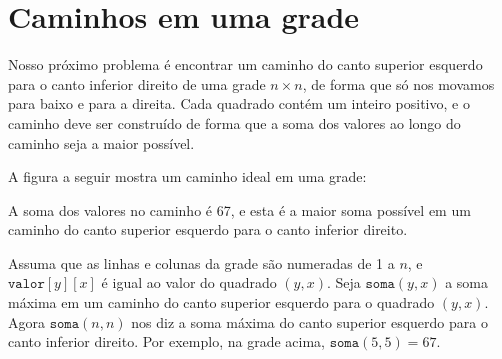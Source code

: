 \section{Caminhos em uma grade}

Nosso próximo problema é encontrar um caminho
do canto superior esquerdo para
o canto inferior direito
de uma grade $n \times n$, de forma que
só nos movamos para baixo e para a direita.
Cada quadrado contém um inteiro positivo,
e o caminho deve ser construído de forma
que a soma dos valores ao longo
do caminho seja a maior possível.

A figura a seguir mostra um caminho ideal
em uma grade:
\begin{center}
\end{center}
A soma dos valores no caminho é 67,
e esta é a maior soma possível em um caminho
do canto superior esquerdo para o canto inferior direito.

Assuma que as linhas e colunas da
grade são numeradas de 1 a $n$,
e $\texttt{valor}[y][x]$ é igual ao valor
do quadrado $(y,x)$.
Seja $\texttt{soma}(y,x)$ a soma máxima
em um caminho do canto superior esquerdo
para o quadrado $(y,x)$.
Agora $\texttt{soma}(n,n)$ nos diz
a soma máxima
do canto superior esquerdo para
o canto inferior direito.
Por exemplo, na grade acima,
$\texttt{soma}(5,5)=67$.

